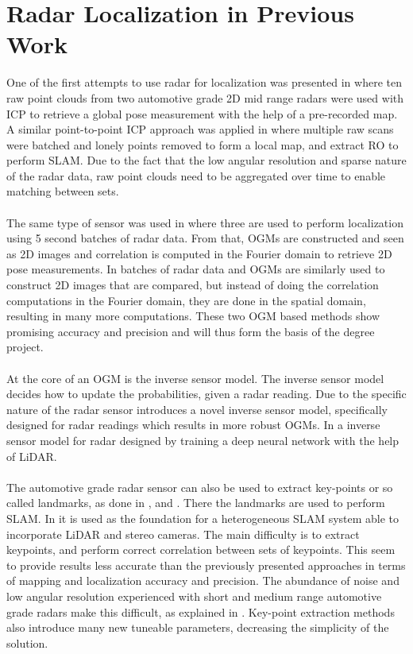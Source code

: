 \section{Radar Localization in Previous Work}
One of the first attempts to use radar for localization was presented in \cite{ward_vehicle_2016} where ten raw point clouds from two automotive grade 2D mid range radars were used with \ac{ICP} to retrieve a global pose measurement with the help of a pre-recorded map. A similar point-to-point ICP approach was applied in \cite{holder_real-time_2019} where multiple raw scans were batched and lonely points removed to form a local map, and extract \ac{RO} to perform \ac{SLAM}. Due to the fact that the low angular resolution and sparse nature of the radar data, raw point clouds need to be aggregated over time to enable matching between sets. 
\\\\
The same type of sensor was used in \cite{narula_automotive-radar-based_2020} where three are used to perform localization using 5 second batches of radar data. From that,  \ac{OGM}s are constructed and seen as 2D images and correlation is computed in the Fourier domain to retrieve 2D pose measurements. In \cite{yoneda_vehicle_2018} batches of radar data and OGMs are similarly used to construct 2D images that are compared, but instead of doing the correlation computations in the Fourier domain, they are done in the spatial domain, resulting in many more computations. These two OGM based methods show promising accuracy and precision and will thus form the basis of the degree project. 
\\\\
At the core of an OGM is the inverse sensor model. The inverse sensor model decides how to update the probabilities, given a radar reading. Due to the specific nature of the radar sensor \cite{slutsky_dual_2019} introduces a novel inverse sensor model, specifically designed for radar readings which results in more robust OGMs. In \cite{weston_probably_2019} a inverse sensor model for radar designed by training a deep neural network with the help of \ac{LiDAR}.
\\\\
The automotive grade radar sensor can also be used to extract key-points or so called landmarks, as done in \cite{jurgens_radar-based_2020}, and \cite{schuster_landmark_2016}. There the landmarks are used to perform SLAM. In \cite{jurgens_radar-based_2020} it is used as the foundation for a heterogeneous SLAM system able to incorporate \ac{LiDAR} and stereo cameras. The main difficulty is to extract keypoints, and perform correct correlation between sets of keypoints. This seem to provide results less accurate than the previously presented approaches in terms of mapping and localization accuracy and precision. The abundance of noise and low angular resolution experienced with short and medium range automotive grade radars make this difficult, as explained in \cite{holder_real-time_2019}. Key-point extraction methods also introduce many new tuneable parameters, decreasing the simplicity of the solution.
